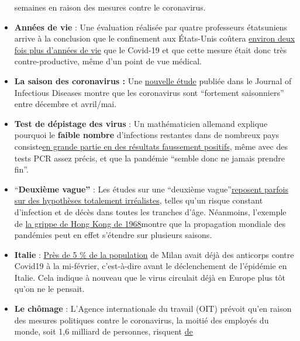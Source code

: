 \begin{itemize}
  semaines en raison des mesures contre le coronavirus.
\item
  \textbf{Années de vie} : Une évaluation réalisée par quatre
  professeurs étatsuniens arrive à la conclusion que le confinement aux
  États-Unis coûtera
  \href{https://thehill.com/opinion/healthcare/499394-the-covid-19-shutdown-will-cost-americans-millions-of-years-of-life}{environ
  deux fois plus d'années de vie} que le Covid-19 et que cette mesure
  était donc très contre-productive, même d'un point de vue médical.
\item
  \textbf{La saison des coronavirus :} Une
  \href{https://academic.oup.com/jid/advance-article/doi/10.1093/infdis/jiaa161/5815743}{nouvelle
  étude} publiée dans le Journal of Infectious Diseases montre que les
  coronavirus sont ``fortement saisonniers'' entre décembre et
  avril/mai.
\item
  \textbf{Test de dépistage des virus} : Un mathématicien allemand
  explique pourquoi le \textbf{faible nombre} d'infections restantes
  dans de nombreux pays
  consiste\href{https://multipolar-magazin.de/artikel/warum-die-pandemie-nicht-endet}{en
  grande partie en des résultats faussement positifs}, même avec des
  tests PCR assez précis, et que la pandémie ``semble donc ne jamais
  prendre fin''.
\item
  ``\textbf{Deuxième vague''} : Les études sur une ``deuxième
  vague''\href{https://www.heise.de/tp/features/Fellay-Studie-Zweite-Corona-Welle-4726303.html}{reposent
  parfois sur des hypothèses totalement irréalistes}, telles qu'un
  risque constant d'infection et de décès dans toutes les tranches
  d'âge. Néanmoins, l'exemple de
  \href{https://www.britannica.com/event/Hong-Kong-flu-of-1968}{la
  grippe de Hong Kong de 1968}montre que la propagation mondiale des
  pandémies peut en effet s'étendre sur plusieurs saisons.
\item
  \textbf{Italie} :
  \href{https://www.medrxiv.org/content/10.1101/2020.05.11.20098442v2}{Près
  de 5 \% de la population} de Milan avait déjà des anticorps contre
  Covid19 à la mi-février, c'est-à-dire avant le déclenchement de
  l'épidémie en Italie. Cela indique à nouveau que le virus circulait
  déjà en Europe plus tôt qu'on ne le pensait.
\item
  \textbf{Le chômage} : L'Agence internationale du travail (OIT) prévoit
  qu'en raison des mesures politiques contre le coronavirus, la moitié
  des employés du monde, soit 1,6 milliard de personnes, risquent
  \href{https://www.theguardian.com/world/2020/apr/29/half-of-worlds-workers-at-immediate-risk-of-losing-livelihood-due-to-coronavirus}{de
}
\end{itemize}
